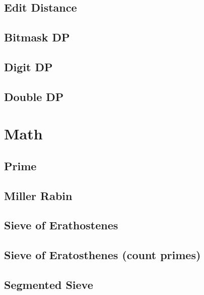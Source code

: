 \documentclass[10pt]{article}
\begin{document}
\begin{multicols*}{2}
\subsection{Edit Distance}


\subsection{Bitmask DP}


\subsection{Digit DP}


\subsection{Double DP}


\section{Math}

\subsection{Prime}


\subsection{Miller Rabin}


\subsection{Sieve of Erathostenes}


\subsection{Sieve of Eratosthenes (count primes)}

\subsection{Segmented Sieve}


\end{multicols*}
\end{document}
